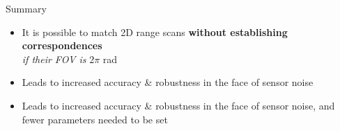 \begin{frame}[noframenumbering]{Summary}

\begin{overlayarea}{\textwidth}{3cm}
\leavevmode
  \begin{itemize}
    \item It is possible to match 2D range scans \textbf{without establishing correspondences}\\
          \textit{if their FOV is} $2\pi$ rad
    \item<2|only@2> Leads to increased accuracy \& robustness in the face of sensor noise
    \item<3|only@3> Leads to increased accuracy \& robustness in the face of sensor noise, and fewer parameters needed to be set
  \end{itemize}

\end{overlayarea}
\end{frame}
